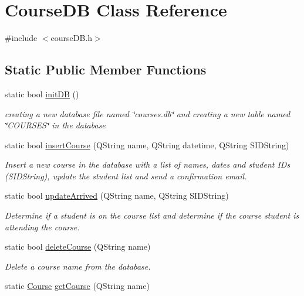 \hypertarget{class_course_d_b}{}\section{Course\+D\+B Class Reference}
\label{class_course_d_b}


{\ttfamily \#include $<$course\+D\+B.\+h$>$}

\subsection*{Static Public Member Functions}
\begin{DoxyCompactItemize}
\item 
static bool \hyperlink{class_course_d_b_af310392b1ba647e7d0d320ac64fec301}{init\+D\+B} ()
\begin{DoxyCompactList}\small\item\em creating a new database file named \char`\"{}courses.\+db\char`\"{} and creating a new table named \char`\"{}\+C\+O\+U\+R\+S\+E\+S\char`\"{} in the database \end{DoxyCompactList}\item 
static bool \hyperlink{class_course_d_b_a4b7e78db87d134769f842ab51aa3f0b4}{insert\+Course} (Q\+String name, Q\+String datetime, Q\+String S\+I\+D\+String)
\begin{DoxyCompactList}\small\item\em Insert a new course in the database with a list of names, dates and student I\+Ds (S\+I\+D\+String), update the student list and send a confirmation email. \end{DoxyCompactList}\item 
static bool \hyperlink{class_course_d_b_a28979532b65bae3adcbca940a89e7779}{update\+Arrived} (Q\+String name, Q\+String S\+I\+D\+String)
\begin{DoxyCompactList}\small\item\em Determine if a student is on the course list and determine if the course student is attending the course. \end{DoxyCompactList}\item 
static bool \hyperlink{class_course_d_b_a31f81ae3094414ea8f14dcceec6532ae}{delete\+Course} (Q\+String name)
\begin{DoxyCompactList}\small\item\em Delete a course name from the database. \end{DoxyCompactList}\item 
static \hyperlink{struct_course}{Course} \hyperlink{class_course_d_b_afc10757467c711b2782bd1c1cb23b0fc}{get\+Course} (Q\+String name)

\end{DoxyCompactItemize}
